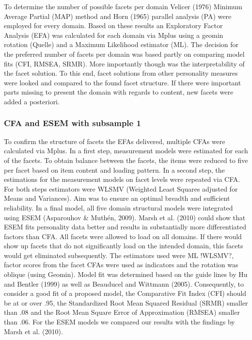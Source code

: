 \documentclass[,man,floatsintext]{apa6}
\theoremstyle{definition}
\theoremstyle{definition}
\theoremstyle{definition}
\theoremstyle{remark}
\begin{document}
To determine the number of possible facets per domain Velicer (1976)
Minimum Average Partial (MAP) method and Horn (1965) parallel analysis
(PA) were employed for every domain. Based on these results an
Exploratory Factor Analysis (EFA) was calculated for each domain via
Mplus using a geomin rotation (Quelle) and a Maximum Likelihood
estimator (ML). The decision for the preferred number of facets per
domain was based partly on comparing model fits (CFI, RMSEA, SRMR). More
importantly though was the interpretability of the facet solution. To
this end, facet solutions from other personality measures were looked
and compared to the found facet structure. If there were important parts
missing to present the domain with regards to content, new facets were
added a posteriori.

\hypertarget{cfa-and-esem-with-subsample-1}{%
\subsubsection{CFA and ESEM with subsample
1}\label{cfa-and-esem-with-subsample-1}}

To confirm the structure of facets the EFAs delivered, multiple CFAs
were calculated via Mplus. In a first step, measurement models were
estimated for each of the facets. To obtain balance between the facets,
the items were reduced to five per facet based on item content and
loading pattern. In a second step, the estimations for the measurement
models on facet levels were repeated via CFA. For both steps estimators
were WLSMV (Weighted Least Squares adjusted for Means and Variances).
Aim was to ensure an optimal breadth and sufficient reliability. In a
final model, all five domain structural models were integrated using
ESEM (Asparouhov \& Muthén, 2009). Marsh et al. (2010) could show that
ESEM fits personality data better and results in substantially more
differentiated factors than CFA. All facets were allowed to load on all
domains. If there would show up facets that do not significantly load on
the intended domain, this facets would get eliminated subsequently. The
estimators used were ML !WLSMV?, factor scores from the facet CFAs were
used as indicators and the rotation was oblique (using Geomin). Model
fit was determined based on the guide lines by Hu and Bentler (1999) as
well as Beauducel and Wittmann (2005). Consequently, to consider a good
fit of a proposed model, the Comparative Fit Index (CFI) should be at or
over .95, the Standardized Root Mean Squared Residual (SRMR) smaller
than .08 and the Root Mean Square Error of Approximation (RMSEA) smaller
than .06. For the ESEM models we compared our results with the findings
by Marsh et al. (2010).
\end{document}
